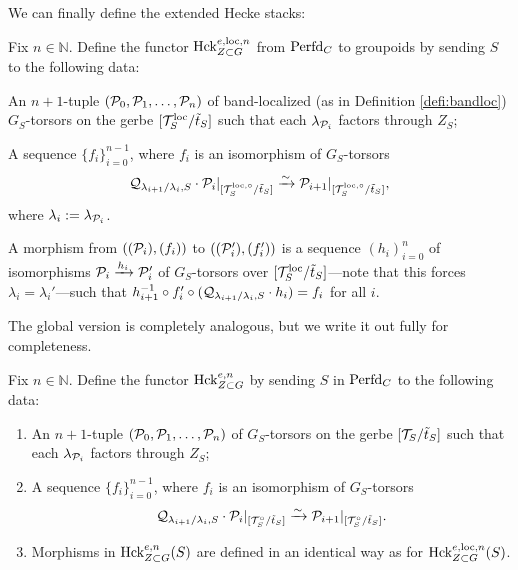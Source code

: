 We can finally define the extended Hecke stacks:
\begin{defi}\label{defi:elochck}
Fix $n \in \mathbb{N}$. Define the functor $\textnormal{Hck}_{Z \subset G}^{e,\mathrm{loc},n}$ from $\mathrm{Perfd}_{C}$ to groupoids by sending $S$ to the following data:
\begin{enumerate}
    \item{An $n+1$-tuple $(\mathcal{P}_{0}, \mathcal{P}_{1}, \dots, \mathcal{P}_{n})$ of band-localized (as in Definition \ref{defi:bandloc}) $G_{S}$-torsors on the gerbe $[\mathcal{T}_{S}^{\mathrm{loc}}/\tilde{t}_{S}]$ such that each $\lambda_{\mathcal{P}_{i}}$ factors through $Z_{S}$;
    
    \item{A sequence $\{f_{i}\}_{i=0}^{n-1}$, where $f_{i}$ is an isomorphism of $G_{S}$-torsors
    \begin{equation*}
        \mathcal{Q}_{\lambda_{i+1}/\lambda_{i},S} \cdot \mathcal{P}_{i}|_{[\mathcal{T}_{S}^{\mathrm{loc},\circ}/\tilde{t}_{S}]} \xrightarrow{\sim} \mathcal{P}_{i+1}|_{[\mathcal{T}_{S}^{\mathrm{loc},\circ}/\tilde{t}_{S}]},
    \end{equation*}
    where $\lambda_{i}:= \lambda_{\mathcal{P}_{i}}$.
    }

    \item{A morphism from $((\mathcal{P}_{i}),(f_{i}))$ to $((\mathcal{P}_{i}'),(f'_{i}))$ is a sequence $(h_{i})_{i=0}^{n}$ of isomorphisms $\mathcal{P}_{i} \xrightarrow{h_{i}} \mathcal{P}_{i}'$ of $G_{S}$-torsors over $[\mathcal{T}_{S}^{\mathrm{loc}}/\tilde{t}_{S}]$---note that this forces $\lambda_{i} = \lambda_{i}'$---such that $h_{i+1}^{-1} \circ f'_{i} \circ (\mathcal{Q}_{\lambda_{i+1}/\lambda_{i},S} \cdot h_{i}) = f_{i}$ for all $i$.}


 
    }
\end{enumerate}
    
\end{defi}
The global version is completely analogous, but we write it out fully for completeness.

\begin{defi}\label{defi:eglobhck}
Fix $n \in \mathbb{N}$. Define the functor $\textnormal{Hck}_{Z \subset G}^{e,n}$ by sending $S$ in $\mathrm{Perfd}_{C}$ to the following data:
\begin{enumerate}
    \item{An $n+1$-tuple $(\mathcal{P}_{0}, \mathcal{P}_{1}, \dots, \mathcal{P}_{n})$ of $G_{S}$-torsors on the gerbe $[\mathcal{T}_{S}/\tilde{t}_{S}]$ such that each $\lambda_{\mathcal{P}_{i}}$ factors through $Z_{S}$;}
    
    \item{A sequence $\{f_{i}\}_{i=0}^{n-1}$, where $f_{i}$ is an isomorphism of $G_{S}$-torsors
    \begin{equation*}
        \mathcal{Q}_{\lambda_{i+1}/\lambda_{i},S} \cdot \mathcal{P}_{i}|_{[\mathcal{T}_{S}^{\circ}/\tilde{t}_{S}]} \xrightarrow{\sim} \mathcal{P}_{i+1}|_{[\mathcal{T}_{S}^{\circ}/\tilde{t}_{S}]} .
    \end{equation*}
    }

 \item{Morphisms in $\textnormal{Hck}_{Z \subset G}^{e,n}(S)$ are defined in an identical way as for $\textnormal{Hck}_{Z \subset G}^{e,\mathrm{loc},n}(S)$.}
\end{enumerate}
\end{defi}

